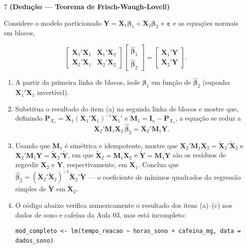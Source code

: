 \documentclass[11pt]{article}
\begin{document}
\begin{questao}{7} \textbf{(Dedução --- Teorema de Frisch-Waugh-Lovell)}

Considere o modelo particionado $\mathbf{Y} = \mathbf{X}_1\boldsymbol\beta_1 +
\mathbf{X}_2\boldsymbol\beta_2 + \boldsymbol\varepsilon$ e as equações normais em blocos,

$$
\begin{bmatrix} \mathbf{X}_1'\mathbf{X}_1 & \mathbf{X}_1'\mathbf{X}_2 \\
\mathbf{X}_2'\mathbf{X}_1 & \mathbf{X}_2'\mathbf{X}_2 \end{bmatrix}
\begin{bmatrix} \hat{\boldsymbol\beta}_1 \\ \hat{\boldsymbol\beta}_2 \end{bmatrix} =
\begin{bmatrix} \mathbf{X}_1'\mathbf{Y} \\ \mathbf{X}_2'\mathbf{Y} \end{bmatrix}.
$$

\begin{enumerate}[label=(\alph*)]
  \item A partir da primeira linha de blocos, isole $\hat{\boldsymbol\beta}_1$ em função de
    $\hat{\boldsymbol\beta}_2$ (suponha $\mathbf{X}_1'\mathbf{X}_1$ invertível).
  \item Substitua o resultado do item (a) na segunda linha de blocos e mostre que, definindo
    $\mathbf{P}_{X_1} = \mathbf{X}_1(\mathbf{X}_1'\mathbf{X}_1)^{-1}\mathbf{X}_1'$ e
    $\mathbf{M}_1 = \mathbf{I}_n - \mathbf{P}_{X_1}$, a equação se reduz a
    $$
    \mathbf{X}_2'\mathbf{M}_1\mathbf{X}_2\,\hat{\boldsymbol\beta}_2 = \mathbf{X}_2'\mathbf{M}_1\mathbf{Y}.
    $$
  \item Usando que $\mathbf{M}_1$ é simétrica e idempotente, mostre que
    $\mathbf{X}_2'\mathbf{M}_1\mathbf{X}_2 = \tilde{\mathbf{X}}_2'\tilde{\mathbf{X}}_2$ e
    $\mathbf{X}_2'\mathbf{M}_1\mathbf{Y} = \tilde{\mathbf{X}}_2'\tilde{\mathbf{Y}}$, em que
    $\tilde{\mathbf{X}}_2 = \mathbf{M}_1\mathbf{X}_2$ e $\tilde{\mathbf{Y}} = \mathbf{M}_1\mathbf{Y}$
    são os resíduos de regredir $\mathbf{X}_2$ e $\mathbf{Y}$, respectivamente, em
    $\mathbf{X}_1$. Conclua que $\hat{\boldsymbol\beta}_2 =
    (\tilde{\mathbf{X}}_2'\tilde{\mathbf{X}}_2)^{-1}\tilde{\mathbf{X}}_2'\tilde{\mathbf{Y}}$ --- o
    coeficiente de mínimos quadrados da regressão simples de $\tilde{\mathbf{Y}}$ em
    $\tilde{\mathbf{X}}_2$.
  \item O código abaixo verifica numericamente o resultado dos itens (a)--(c) nos dados de sono e
    cafeína da Aula 03, mas está incompleto:
\begin{lstlisting}
mod_completo <- lm(tempo_reacao ~ horas_sono + cafeina_mg, data = dados_sono)


\end{lstlisting}
\end{enumerate}
\end{questao}
\end{document}
